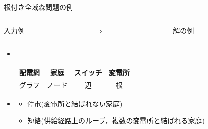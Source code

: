 \documentclass[dvipdfmx,11pt]{beamer}
\begin{document}
\begin{frame}{根付き全域森問題の例}
  \begin{columns}
    \begin{column}{0.45\textwidth}\centering
      \begin{exampleblock}{入力例}
	\centering
	
      \end{exampleblock}
    \end{column}
    \begin{column}{0.05\textwidth}\centering
      $\Rightarrow$
    \end{column}
    \begin{column}{0.45\textwidth}\centering
      \begin{exampleblock}{解の例}
        \centering
        
      \end{exampleblock}
    \end{column}
  \end{columns}
  \vfill
  \begin{itemize}
  \item {} \\
	 \begin{center}
      \begin{minipage}[c]{0.6\textwidth}
	   \begin{block}{}
		\centering
		\begin{tabular}{c|ccc}
		配電網 & 家庭 & スイッチ & 変電所 \\
		\hline
		グラフ & ノード & 辺 & 根
		\end{tabular}
	   \end{block}
      \end{minipage}
	 \end{center}\vfill
   \item {}
		 \begin{itemize}
		  \item 停電(変電所と結ばれない家庭)
		  \item 短絡(供給経路上のループ，複数の変電所と結ばれる家庭)
		 \end{itemize}
  \end{itemize}
\end{frame}
\end{document}
